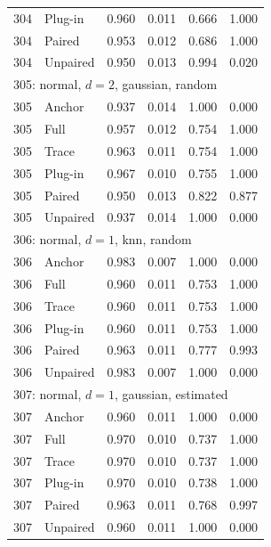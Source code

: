 \begin{longtable}{llrrrr}
304 & Plug-in & 0.960 & 0.011 & 0.666 & 1.000 \\
304 & Paired & 0.953 & 0.012 & 0.686 & 1.000 \\
304 & Unpaired & 0.950 & 0.013 & 0.994 & 0.020 \\
\multicolumn{6}{l}{305: normal, $d=2$, gaussian, random}\\
305 & Anchor & 0.937 & 0.014 & 1.000 & 0.000 \\
305 & Full & 0.957 & 0.012 & 0.754 & 1.000 \\
305 & Trace & 0.963 & 0.011 & 0.754 & 1.000 \\
305 & Plug-in & 0.967 & 0.010 & 0.755 & 1.000 \\
305 & Paired & 0.950 & 0.013 & 0.822 & 0.877 \\
305 & Unpaired & 0.937 & 0.014 & 1.000 & 0.000 \\
\multicolumn{6}{l}{306: normal, $d=1$, knn, random}\\
306 & Anchor & 0.983 & 0.007 & 1.000 & 0.000 \\
306 & Full & 0.960 & 0.011 & 0.753 & 1.000 \\
306 & Trace & 0.960 & 0.011 & 0.753 & 1.000 \\
306 & Plug-in & 0.960 & 0.011 & 0.753 & 1.000 \\
306 & Paired & 0.963 & 0.011 & 0.777 & 0.993 \\
306 & Unpaired & 0.983 & 0.007 & 1.000 & 0.000 \\
\multicolumn{6}{l}{307: normal, $d=1$, gaussian, estimated}\\
307 & Anchor & 0.960 & 0.011 & 1.000 & 0.000 \\
307 & Full & 0.970 & 0.010 & 0.737 & 1.000 \\
307 & Trace & 0.970 & 0.010 & 0.737 & 1.000 \\
307 & Plug-in & 0.970 & 0.010 & 0.738 & 1.000 \\
307 & Paired & 0.963 & 0.011 & 0.768 & 0.997 \\
307 & Unpaired & 0.960 & 0.011 & 1.000 & 0.000 \\
\end{longtable}
